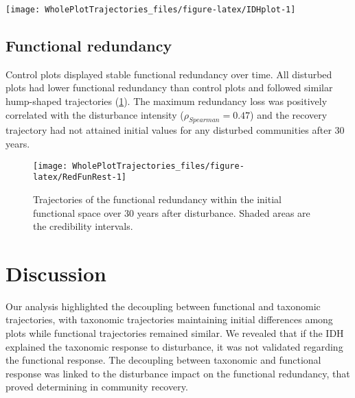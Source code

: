 \documentclass[fleqn,10pt]{ArtEcoFoG} %
\begin{document}
\begin{figure*}

{\centering \texttt{[image: WholePlotTrajectories\_files/figure-latex/IDHplot-1]} 

}

\caption{Relationship between the initial \%AGB loss and community taxonomic richness \textbf{(a)}, taxonomic evenness \textbf{(b)}, functional richness \textbf{(c)},and functional evenness \textbf{(d)} at 10, 20 and 30 years after disturbance}\label{fig:IDHplot}
\end{figure*}

\subsection{Functional redundancy}\label{functional-redundancy}

Control plots displayed stable functional redundancy over time. All
disturbed plots had lower functional redundancy than control plots and
followed similar hump-shaped trajectories (\ref{fig:RedFunRest}). The
maximum redundancy loss was positively correlated with the disturbance
intensity (\(\rho_{Spearman}=0.47\)) and the recovery trajectory had not
attained initial values for any disturbed communities after 30 years.

\begin{figure}

{\centering \texttt{[image: WholePlotTrajectories\_files/figure-latex/RedFunRest-1]} 

}

\caption{Trajectories of the functional redundancy within the initial functional space over 30 years after disturbance. Shaded areas are the credibility intervals.}\label{fig:RedFunRest}
\end{figure}

\section{Discussion}\label{discussion}

Our analysis highlighted the decoupling between functional and taxonomic
trajectories, with taxonomic trajectories maintaining initial
differences among plots while functional trajectories remained similar.
We revealed that if the IDH explained the taxonomic response to
disturbance, it was not validated regarding the functional response. The
decoupling between taxonomic and functional response was linked to the
disturbance impact on the functional redundancy, that proved determining
in community recovery.
\end{document}
